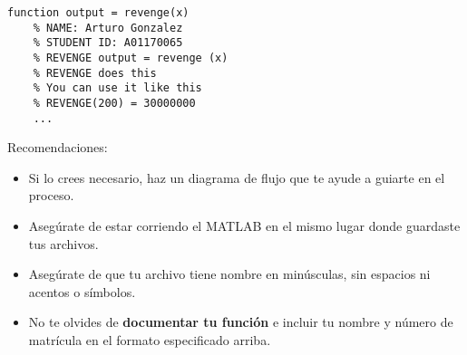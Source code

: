 \documentclass[]{book}
\theoremstyle{definition}
\begin{document}
\bigskip

\begin{lstlisting}[style=Matlab-editor]
    function output = revenge(x)
    % NAME: Arturo Gonzalez
    % STUDENT ID: A01170065
    % REVENGE output = revenge (x)
    % REVENGE does this
    % You can use it like this
    % REVENGE(200) = 30000000
    ...
\end{lstlisting}

\pagebreak

{\Large Recomendaciones:}
\begin{itemize}
    \item Si lo crees necesario, haz un diagrama de flujo que te ayude a guiarte en el proceso.
    \item Asegúrate de estar corriendo el MATLAB en el mismo lugar donde guardaste tus archivos.
    \item Asegúrate de que tu archivo tiene nombre en minúsculas, sin espacios ni acentos o símbolos. 
    \item No te olvides de \textbf{documentar tu función} e incluir tu nombre y número de matrícula en el formato especificado arriba.
\end{itemize}
\end{document}

